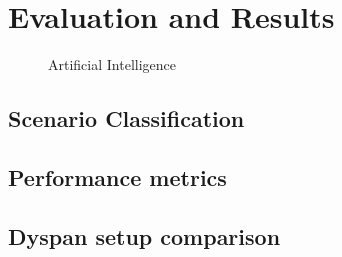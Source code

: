 \acresetall
\chapter{Evaluation and Results}\label{chapter:evaluation}\label{ch:evaluation}

\begin{figure}[htb]
    \centering
      
      \caption{Artificial Intelligence}
      \label{fig:test}
\end{figure}

\section{Scenario Classification}
\section{Performance metrics}
\section{Dyspan setup comparison}
